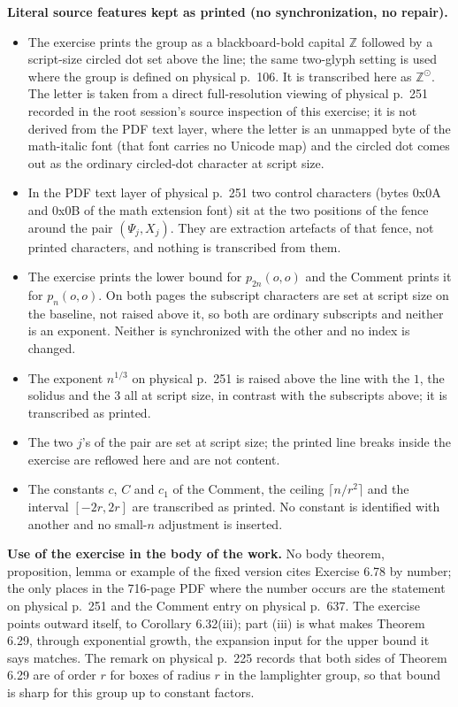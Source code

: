 \documentclass[11pt]{article}
\newcommand{\Z}{\mathbb{Z}}
\begin{document}
\medskip\noindent\textbf{Literal source features kept as printed (no synchronization, no repair).}
\begin{itemize}
\item The exercise prints the group as a blackboard-bold capital $\Z$ followed by a script-size circled dot set above the line; the same two-glyph setting is used where the group is defined on physical p.\ 106. It is transcribed here as $\Z^{\odot}$. The letter is taken from a direct full-resolution viewing of physical p.\ 251 recorded in the root session's source inspection of this exercise; it is not derived from the PDF text layer, where the letter is an unmapped byte of the math-italic font (that font carries no Unicode map) and the circled dot comes out as the ordinary circled-dot character at script size.
\item In the PDF text layer of physical p.\ 251 two control characters (bytes 0x0A and 0x0B of the math extension font) sit at the two positions of the fence around the pair $(\Psi_j,X_j)$. They are extraction artefacts of that fence, not printed characters, and nothing is transcribed from them.
\item The exercise prints the lower bound for $p_{2n}(o,o)$ and the Comment prints it for $p_n(o,o)$. On both pages the subscript characters are set at script size on the baseline, not raised above it, so both are ordinary subscripts and neither is an exponent. Neither is synchronized with the other and no index is changed.
\item The exponent $n^{1/3}$ on physical p.\ 251 is raised above the line with the $1$, the solidus and the $3$ all at script size, in contrast with the subscripts above; it is transcribed as printed.
\item The two $j$'s of the pair are set at script size; the printed line breaks inside the exercise are reflowed here and are not content.
\item The constants $c$, $C$ and $c_1$ of the Comment, the ceiling $\lceil n/r^{2}\rceil$ and the interval $[-2r,2r]$ are transcribed as printed. No constant is identified with another and no small-$n$ adjustment is inserted.
\end{itemize}

\medskip\noindent\textbf{Use of the exercise in the body of the work.}
No body theorem, proposition, lemma or example of the fixed version cites Exercise 6.78 by number; the only places in the 716-page PDF where the number occurs are the statement on physical p.\ 251 and the Comment entry on physical p.\ 637. The exercise points outward itself, to Corollary 6.32(iii); part (iii) is what makes Theorem 6.29, through exponential growth, the expansion input for the upper bound it says matches. The remark on physical p.\ 225 records that both sides of Theorem 6.29 are of order $r$ for boxes of radius $r$ in the lamplighter group, so that bound is sharp for this group up to constant factors.
\end{document}
